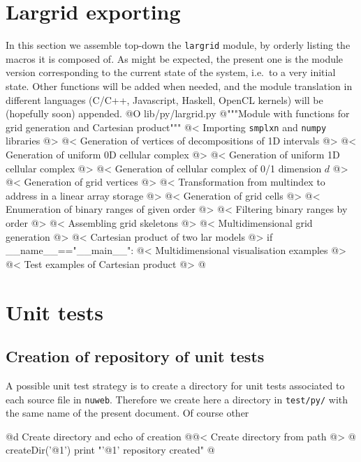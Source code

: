 \documentclass[11pt,oneside]{article}	%
\begin{document}
\section{Largrid exporting}
\label{sec:largrid}
In this section we assemble top-down the \texttt{largrid} module, by orderly listing the macros it is composed of. As might be expected, the present one is the module version corresponding to the current state of the system, i.e.~to a very initial state. Other functions will be added when needed, and the module translation in different languages (C/C++, Javascript, Haskell, OpenCL kernels) will be (hopefully soon) appended.
@O lib/py/largrid.py
@{"""Module with functions for grid generation and Cartesian product"""
@< Importing \texttt{smplxn} and \texttt{numpy} libraries @>
@< Generation of vertices of decompositions of 1D intervals  @>
@< Generation of uniform 0D cellular complex  @>
@< Generation of uniform 1D cellular complex  @>
@< Generation of cellular complex of 0/1 dimension $d$ @>
@< Generation of grid vertices  @>
@< Transformation from multindex to address in a linear array storage @>
@< Generation of grid cells  @>
@< Enumeration of binary ranges of given order @>
@< Filtering binary ranges by order @>
@< Assembling grid skeletons @>
@< Multidimensional grid generation @>
@< Cartesian product of two lar models   @>
if __name__=="__main__":
	@< Multidimensional visualisation examples @>
	@< Test examples of Cartesian product @>
@}


\section{Unit tests}
\label{sec:tests}

\subsection{Creation of repository of unit tests}

A possible unit test strategy is to create a directory for unit tests associated to each source file in \texttt{nuweb}. Therefore we create here a directory in \texttt{test/py/} with the same name of the present document. Of course other 

@d Create directory and echo of creation
@{@< Create directory from path @>
@%
createDir('@1')
print "'@1' repository created"
@}
\end{document}

